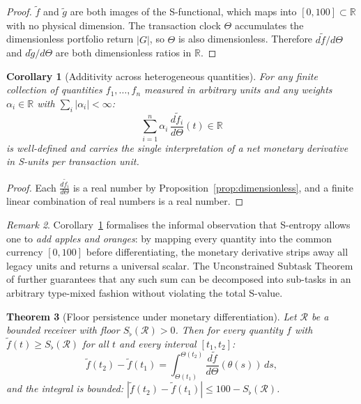 \documentclass[twocolumn,11pt,a4paper]{article}
\theoremstyle{thmstyle}
\newtheorem{theorem}{Theorem}[section]
\newtheorem{corollary}[theorem]{Corollary}
\theoremstyle{definition}
\theoremstyle{remark}
\newtheorem{remark}[theorem]{Remark}
\newcommand{\Gain}{G}                        %
\newcommand{\Clock}{\Theta}                  %
\newcommand{\InvClock}{\theta}               %
\newcommand{\Mdiff}[1]{\frac{d#1}{d\Clock}} %
\newcommand{\Sfloor}{S_{\flat}}              %
\newcommand{\Real}{\mathbb{R}}
\begin{document}
\begin{proof}
$\tilde{f}$ and $\tilde{g}$ are both images of the
S-functional, which maps into $[0,100]\subset\Real$
with no physical dimension.  The transaction clock $\Clock$
accumulates the dimensionless portfolio return $|\Gain|$,
so $\Clock$ is also dimensionless.  Therefore
$d\tilde{f}/d\Clock$ and $d\tilde{g}/d\Clock$ are both
dimensionless ratios in $\Real$.
\end{proof}

\begin{corollary}[Additivity across heterogeneous quantities]
\label{cor:additivity}
For any finite collection of quantities $f_{1},\ldots,f_{n}$
measured in arbitrary units and any weights
$\alpha_{i}\in\Real$ with $\sum_{i}|\alpha_{i}|<\infty$:
\begin{equation}\label{eq:additivity}
  \sum_{i=1}^{n} \alpha_{i}\,\Mdiff{\tilde{f}_{i}}(t)
  \in \Real
\end{equation}
is well-defined and carries the single interpretation of
a \emph{net monetary derivative in S-units per transaction unit}.
\end{corollary}

\begin{proof}
Each $\Mdiff{\tilde{f}_{i}}$ is a real number by
Proposition~\ref{prop:dimensionless}, and a finite linear
combination of real numbers is a real number.
\end{proof}

\begin{remark}\label{rem:adding-apples-oranges}
Corollary~\ref{cor:additivity} formalises the informal
observation that S-entropy allows one to \emph{add apples
and oranges}: by mapping every quantity into the common
currency $[0,100]$ before differentiating, the monetary
derivative strips away all legacy units and returns a
universal scalar.  The Unconstrained Subtask Theorem of
\citet{Sachikonye2024S} further guarantees that any such
sum can be decomposed into sub-tasks in an arbitrary
type-mixed fashion without violating the total S-value.
\end{remark}

\begin{theorem}[Floor persistence under monetary differentiation]
\label{thm:floor-persistence}
Let $\mathcal{R}$ be a bounded receiver with floor
$\Sfloor(\mathcal{R})>0$.  Then for every quantity $f$
with $\tilde{f}(t)\geq\Sfloor(\mathcal{R})$ for all $t$
and every interval $[t_{1},t_{2}]$:
\begin{equation}
  \tilde{f}(t_{2}) - \tilde{f}(t_{1})
  = \int_{\Clock(t_{1})}^{\Clock(t_{2})}
    \Mdiff{\tilde{f}}(\InvClock(s))\,ds,
\end{equation}
and the integral is bounded:
$|\tilde{f}(t_{2})-\tilde{f}(t_{1})|\leq 100-\Sfloor(\mathcal{R})$.
\end{theorem}
\end{document}
